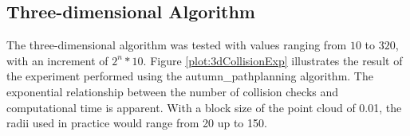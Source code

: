 

\subsection{Three-dimensional Algorithm}

The three-dimensional algorithm was tested with values ranging from $10$ to $320$, with an increment of $2^n * 10$. Figure \ref{plot:3dCollisionExp} illustrates the result of the experiment performed using the autumn\_pathplanning algorithm. The exponential relationship between the number of collision checks and computational time is apparent. With a block size of the point cloud of 0.01, the radii used in practice would range from 20 up to 150.


